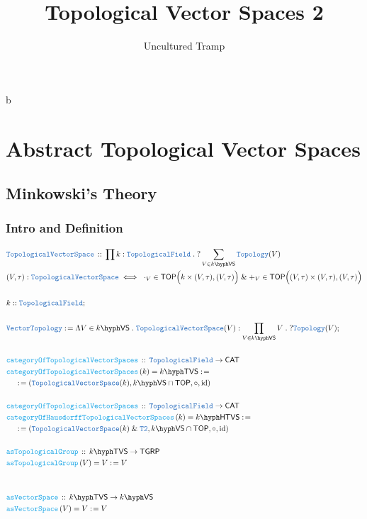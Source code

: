 \documentclass[12pt]{scrartcl}
\title{Topological Vector Spaces 2}
\author{Uncultured Tramp}
\newcommand{\TYPE}[1]{\textcolor{NavyBlue}{\mathtt{#1}}}
\newcommand{\FUNC}[1]{\textcolor{Cerulean}{\mathtt{#1}}}
\renewcommand{\.}{\; . \;}
\newcommand{\de}{: \kern 0.1pc =}
\newcommand{\Act}[1]{\left( #1 \right)}
\newcommand{\DeclareType}[2]{& \TYPE{#1} \, :: \, #2 \\}
\newcommand{\DefineType}[3]{& #1 : \TYPE{#2} \iff #3 \\}
\newcommand{\DeclareFunc}[2]{& \FUNC{#1} \, :: \, #2 \\}
\newcommand{\DefineNamedFunc}[4]{&  \FUNC{#1}\Act{#2} = #3 \de #4 \\}
\newcommand{\NewLine}{\\ & \kern 1pc}
\newcommand{\Page}[1]{ \begin{align*} #1 \end{align*}   }
\renewcommand{\And}{\; \& \;}
\DeclareMathOperator*{\id}{id}
\newcommand{\Conclude}[3]{& #1 \de #2 : #3; \\}
\newcommand{\CAT}{\mathsf{CAT}}
\newcommand{\Top}{\TYPE{Topology}}
\newcommand{\TOP}{\mathsf{TOP}}
\newcommand{\VS}[1]{#1\hyph\mathsf{VS}} %
\newcommand{\TGRP}{\mathsf{TGRP}}
\newcommand{\TopField}{\TYPE{TopologicalField}}
\newcommand{\TopVS}{\TYPE{TopologicalVectorSpace}}
\newcommand{\Vect}{\TYPE{Vector}}
\newcommand{\TVS}[1]{{#1}\hyph\mathsf{TVS}}
\newcommand{\HTVS}[1]{{#1}\hyph\mathsf{HTVS}}
\begin{document}
\maketitle
\newpage
\tableofcontents
\newpage
b\section{Abstract Topological Vector Spaces}
\subsection{Minkowski's Theory}
\subsubsection{Intro and Definition}
\Page{
	\DeclareType{\TopVS}{\prod k : \TopField \. ? \sum_{V \in \VS{k}} \Top(V)}
	\DefineType{(V,\tau)}{\TopVS}{\
		\cdot_V \in \TOP\Big( k \times (V,\tau),(V,\tau)\Big) \And 
		+_V \in \TOP\Big( (V,\tau) \times (V,\tau),(V,\tau)\Big)
	}
	\\
	& k :: \TopField ;\\
	\\
	\Conclude{\Vect\Top}{\Lambda V \in \VS{k} \. \TopVS(V)}
	{\prod_{V \in \VS{k}} V \. ? \Top(V)} 
	\\
	\DeclareFunc{categoryOfTopologicalVectorSpaces}
	{
		\TopField \to \CAT
	}
	\DefineNamedFunc{categoryOfTopologicalVectorSpaces}{k}{\TVS{k}}
	{
		\NewLine \de		
		(\TopVS(k),\VS{k} \cap \TOP,\circ,\id)
	}
	\\
	\DeclareFunc{categoryOfTopologicalVectorSpaces}
	{
		\TopField \to \CAT
	}
	\DefineNamedFunc{categoryOfHausdorffTopologicalVectorSpaces}{k}{\HTVS{k}}
	{
		\NewLine \de		
		(\TopVS(k) \And \TYPE{T2},\VS{k} \cap \TOP,\circ,\id)
	}
	\\
	\DeclareFunc{asTopologicalGroup}
	{
		\TVS{k} \to \TGRP
	}
	\DefineNamedFunc{asTopologicalGroup}{V}{V}{V}
	\\
	\\
	\DeclareFunc{asVectorSpace}
	{
		\TVS{k} \to \VS{k}
	}
	\DefineNamedFunc{asVectorSpace}{V}{V}{V}
	\\
}
\newpage
\end{document}
